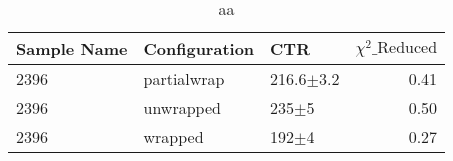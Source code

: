 \begin{table}
\caption{aa}
\begin{tabular}{lllr}
\hline
Sample Name & Configuration &            CTR &  $\chi^2\_\text{Reduced}$ \\
\hline
       2396 &   partialwrap &  216.6$\pm$3.2 &                     0.41 \\
       2396 &     unwrapped &      235$\pm$5 &                     0.50 \\
       2396 &       wrapped &      192$\pm$4 &                     0.27 \\
\hline
\end{tabular}
\end{table}